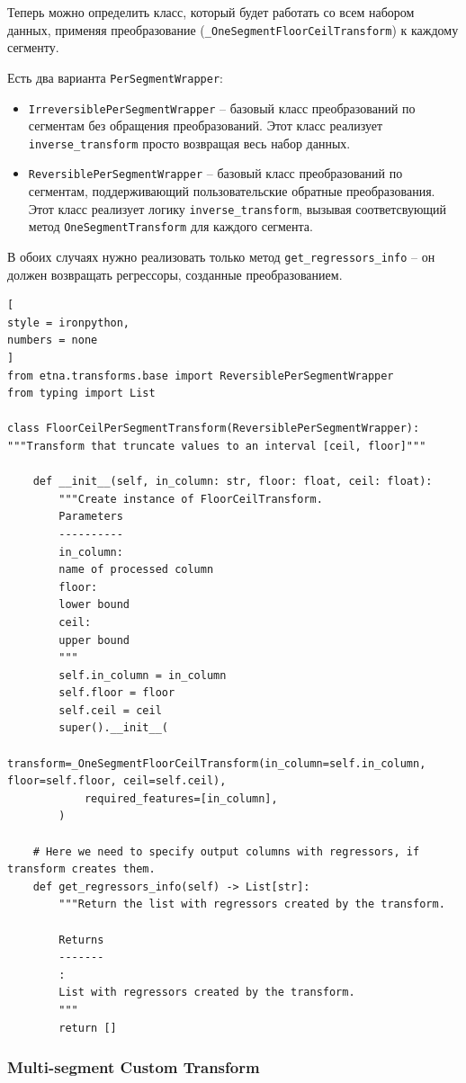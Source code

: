 \documentclass[%
	11pt,
	a4paper,
	utf8,
		]{article}
\begin{document}
Теперь можно определить класс, который будет работать со всем набором данных, применяя преобразование (\verb|_OneSegmentFloorCeilTransform|) к каждому сегменту.

Есть два варианта \verb|PerSegmentWrapper|:
\begin{itemize}
	\item \verb|IrreversiblePerSegmentWrapper| -- базовый класс преобразований по сегментам без обращения преобразований. Этот класс реализует \verb|inverse_transform| просто возвращая весь набор данных.
	
	\item \verb|ReversiblePerSegmentWrapper| -- базовый класс преобразований по сегментам, поддерживающий пользовательские обратные преобразования. Этот класс реализует логику \verb|inverse_transform|, вызывая соответсвующий метод \verb|OneSegmentTransform| для каждого сегмента.
\end{itemize}

В обоих случаях нужно реализовать только метод \verb|get_regressors_info| -- он должен возвращать регрессоры, созданные преобразованием.

\begin{lstlisting}[
style = ironpython,
numbers = none	
]
from etna.transforms.base import ReversiblePerSegmentWrapper
from typing import List

class FloorCeilPerSegmentTransform(ReversiblePerSegmentWrapper):
"""Transform that truncate values to an interval [ceil, floor]"""

	def __init__(self, in_column: str, floor: float, ceil: float):
		"""Create instance of FloorCeilTransform.
		Parameters
		----------
		in_column:
		name of processed column
		floor:
		lower bound
		ceil:
		upper bound
		"""
		self.in_column = in_column
		self.floor = floor
		self.ceil = ceil
		super().__init__(
			transform=_OneSegmentFloorCeilTransform(in_column=self.in_column, floor=self.floor, ceil=self.ceil),
			required_features=[in_column],
		)

	# Here we need to specify output columns with regressors, if transform creates them.
	def get_regressors_info(self) -> List[str]:
		"""Return the list with regressors created by the transform.
		
		Returns
		-------
		:
		List with regressors created by the transform.
		"""
		return []
\end{lstlisting}

\subsubsection{Multi-segment Custom Transform}
\end{document}
